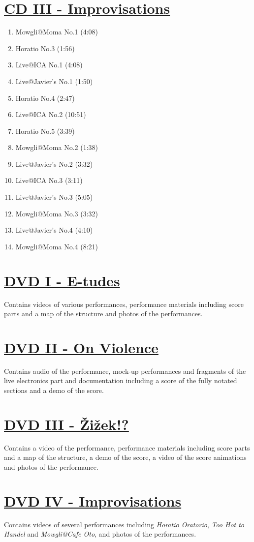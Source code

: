 \section*{\href{http://phd.federicoreuben.com/contents/audio/improvisations/}{CD III - Improvisations}}

\begin{enumerate}
\item Mowgli@Moma No.1 (4:08)
\item Horatio No.3 (1:56)
\item Live@ICA No.1 (4:08)
\item Live@Javier's No.1 (1:50)
\item Horatio No.4 (2:47)
\item Live@ICA No.2 (10:51)
\item Horatio No.5 (3:39)
\item Mowgli@Moma No.2 (1:38)
\item Live@Javier's No.2 (3:32)
\item Live@ICA No.3 (3:11)
\item Live@Javier's No.3 (5:05)
\item Mowgli@Moma No.3 (3:32)
\item Live@Javier's No.4 (4:10)
\item Mowgli@Moma No.4 (8:21)
\end{enumerate}

\section*{\href{http://phd.federicoreuben.com/etudes/}{DVD I - E-tudes}}

Contains videos of various performances, performance materials including score parts and a map of the structure and photos of the performances.

\section*{\href{http://phd.federicoreuben.com/onviolence/}{DVD II - On Violence}}

Contains audio of the performance, mock-up performances and fragments of the live electronics part and documentation including a score of the fully notated sections and a demo of the score.

\section*{\href{http://phd.federicoreuben.com/zizek/}{DVD III - \v{Z}i\v{z}ek!?}}

Contains a video of the performance, performance materials including score parts and a map of the structure, a demo of the score, a video of the score animations and photos of the performance.

\section*{\href{http://phd.federicoreuben.com/improvisations/}{DVD IV - Improvisations}}

Contains videos of several performances including \emph{Horatio Oratorio}, \emph{Too Hot to Handel} and \emph{Mowgli@Cafe Oto}, and photos of the performances.
